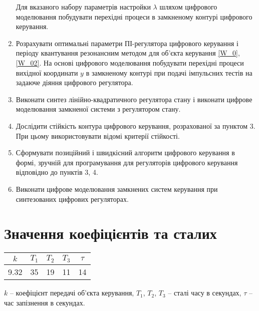 \begin{enumerate}
        Для вказаного набору параметрів настройки $\lambda$ шляхом цифрового моделювання побудувати перехідні процеси в замкненому контурі цифрового керування.
    \item  Розрахувати оптимальні параметри ПІ-регулятора цифрового керування і 
        періоду квантування резонансним методом для об'єкта керування \eqref{W_0}, \eqref{W_02}. На основі цифрового моделювання побудувати перехідні процеси 
        вихідної координати $y$ в замкненому контурі при подачі імпульсних тестів 
        на задаюче діяння цифрового регулятора. 
    \item Виконати синтез лінійно-квадратичного регулятора стану і виконати 
        цифрове моделювання замкненої системи з регулятором стану. 
    \item Дослідити стійкість контура цифрового керування, розрахованої за 
        пунктом 3. При цьому використовувати відомі критерії стійкості. 
    \item Сформувати позиційний і швидкісний алгоритм цифрового керування в формі, зручній для програмування для регуляторів цифрового керування відповідно до пунктів 3, 4.
    \item Виконати цифрове моделювання замкнених систем керування при синтезованих цифрових регуляторах.
\end{enumerate}

\section{Значення коефіцієнтів та сталих}
\begin{center}
    \begin{tabular}{|c|c|c|c|c|}
        \hline
        $k$ & $T_1$ & $T_2$ & $T_3$ & $\tau$ \\
        \hline
        9.32 & 35 & 19 & 11 & 14 \\ 
        \hline
    \end{tabular}
\end{center}
$k$ -- коефіцієнт передачі об'єкта керування, $T_1$, $T_2$, $T_3$ -- сталі часу в секундах, $\tau$ -- час запізнення в секундах.